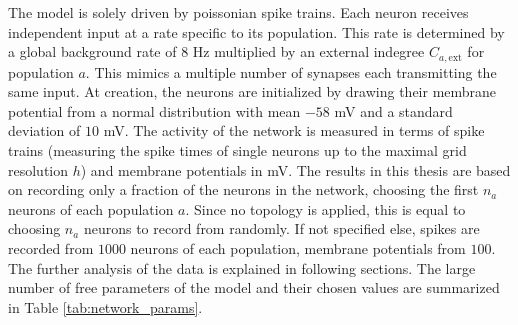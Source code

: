 The model is solely driven by poissonian spike trains. Each neuron receives independent 
input at a rate specific to its population. This rate is determined by a global 
background rate of $8$ Hz multiplied by an external indegree $C_{a, \text{ext}}$ for
population $a$. This mimics a multiple number of synapses each transmitting the same input. 
At creation, the neurons are initialized by drawing their membrane potential from a normal
distribution with mean $-58$ mV and a standard deviation of $10$ mV. 
The activity of the network is measured in terms of spike trains (measuring the spike times 
of single neurons up to the maximal grid resolution $h$) and membrane potentials in mV. 
The results in this thesis are based on recording only a fraction of the neurons in the network, 
choosing the first $n_a$ neurons of each population $a$. Since no topology is applied, this is 
equal to choosing $n_a$ neurons to record from randomly. If not specified else, spikes are recorded 
from $1000$ neurons of each population, membrane potentials from $100$. The further analysis of the data 
is explained in following sections.
The large number of free parameters of the model and their chosen values are summarized in 
Table \ref{tab:network_params}. 
